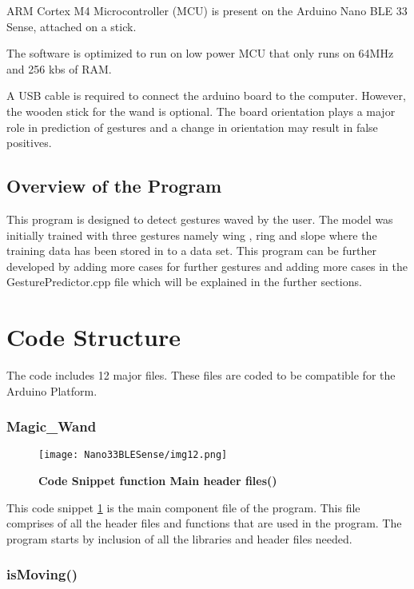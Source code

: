 ARM Cortex M4 Microcontroller (MCU) is present on the Arduino Nano BLE 33 Sense, attached on a stick. 

The software is optimized to run on low power MCU that only runs on 64MHz and 256 kbs of RAM.

A USB cable is required to connect the arduino board to the computer. However,  the wooden stick for the wand is optional. The board orientation plays a major role in prediction of gestures and a change in orientation may result in false positives.



\subsection{Overview of the Program}
This program is designed to detect gestures waved by the user. The model was initially trained with three gestures namely wing , ring and slope where the training data has been stored in to a data set. This program can be further developed by adding more cases for further gestures and adding more cases in the GesturePredictor.cpp file which will be explained in the further sections. 

\section {Code Structure}

The code includes 12 major files. These files are coded to be compatible for the Arduino Platform. 

\subsubsection{Magic\_Wand}
\begin{figure}[h!]
    \texttt{[image: Nano33BLESense/img12.png]}
    \caption{\textbf{Code Snippet function Main header files()}}
    \label{fig:Main()}
\end{figure}


This code snippet \ref{fig:Main()} is the main component file of the program. This file comprises of all the header files and  functions that are used in the program. The program starts by inclusion of all the libraries and header files needed. 




\subsubsection{isMoving()} 

